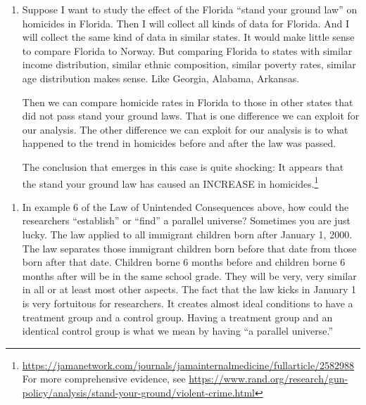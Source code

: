 \documentclass[
]{book}
\providecommand{\tightlist}{%
  \setlength{\itemsep}{0pt}\setlength{\parskip}{0pt}}
\begin{document}
\begin{enumerate}
\def\labelenumi{\arabic{enumi}.}
\item
  Suppose I want to study the effect of the Florida ``stand your ground law'' on homicides in Florida. Then I will collect all kinds of data for Florida. And I will collect the same kind of data in similar states. It would make little sense to compare Florida to Norway. But comparing Florida to states with similar income distribution, similar ethnic composition, similar poverty rates, similar age distribution makes sense. Like Georgia, Alabama, Arkansas.

  Then we can compare homicide rates in Florida to those in other states that did not pass stand your ground laws. That is one difference we can exploit for our analysis. The other difference we can exploit for our analysis is to what happened to the trend in homicides before and after the law was passed.

  The conclusion that emerges in this case is quite shocking: It appears that the stand your ground law has caused an INCREASE in homicides.\footnote{\url{https://jamanetwork.com/journals/jamainternalmedicine/fullarticle/2582988}
    For more comprehensive evidence, see
    \url{https://www.rand.org/research/gun-policy/analysis/stand-your-ground/violent-crime.html}}
\end{enumerate}

\begin{enumerate}
\def\labelenumi{\arabic{enumi}.}
\setcounter{enumi}{1}
\tightlist
\item
  In example 6 of the Law of Unintended Consequences above, how could the researchers ``establish'' or ``find'' a parallel universe? Sometimes you are just lucky. The law applied to all immigrant children born after January 1, 2000. The law separates those immigrant children born before that date from those born after that date. Children borne 6 months before and children borne 6 months after will be in the same school grade. They will be very, very similar in all or at least most other aspects. The fact that the law kicks in January 1 is very fortuitous for researchers. It creates almost ideal conditions to have a treatment group and a control group. Having a treatment group and an identical control group is what we mean by having ``a parallel universe.''
\end{enumerate}
\end{document}
